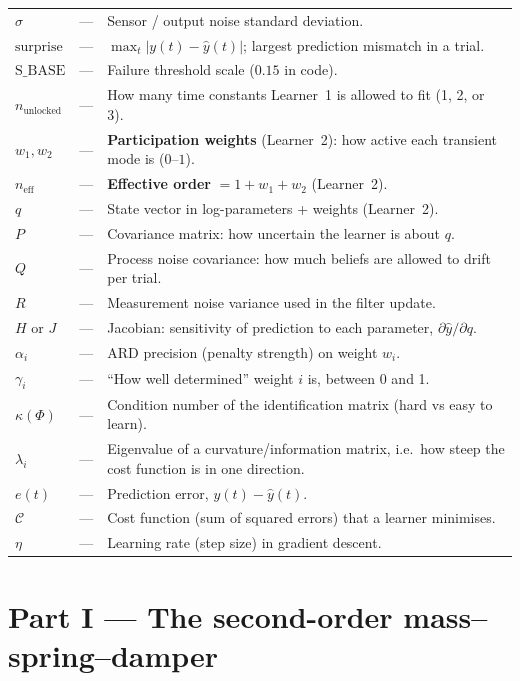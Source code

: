\documentclass[11pt,a4paper]{article}
\newcommand{\surprise}{\text{surprise}}
\newcommand{\neff}{n_{\mathrm{eff}}}
\begin{document}
\begin{longtable}{@{}p{2.4cm}p{1.6cm}p{9.8cm}@{}}
$\sigma$ & --- & Sensor / output noise standard deviation. \\
$\surprise$ & --- & $\max_t|y(t)-\hat y(t)|$; largest prediction mismatch in a trial. \\
$\mathrm{S\_BASE}$ & --- & Failure threshold scale ($0.15$ in code). \\
$n_{\mathrm{unlocked}}$ & --- & How many time constants Learner~1 is allowed to fit (1, 2, or 3). \\
$w_1,w_2$ & --- & \textbf{Participation weights} (Learner~2): how active each transient mode is ($0$--$1$). \\
$\neff$ & --- & \textbf{Effective order} $=1+w_1+w_2$ (Learner~2). \\
$q$ & --- & State vector in log-parameters + weights (Learner~2). \\
$P$ & --- & Covariance matrix: how uncertain the learner is about $q$. \\
$Q$ & --- & Process noise covariance: how much beliefs are allowed to drift per trial. \\
$R$ & --- & Measurement noise variance used in the filter update. \\
$H$ or $J$ & --- & Jacobian: sensitivity of prediction to each parameter, $\partial \hat y/\partial q$. \\
$\alpha_i$ & --- & ARD precision (penalty strength) on weight $w_i$. \\
$\gamma_i$ & --- & ``How well determined'' weight $i$ is, between 0 and 1. \\
$\kappa(\Phi)$ & --- & Condition number of the identification matrix (hard vs easy to learn). \\
$\lambda_i$ & --- & Eigenvalue of a curvature/information matrix, i.e.\ how steep the cost function is in one direction. \\
$e(t)$ & --- & Prediction error, $y(t)-\hat y(t)$. \\
$\mathcal C$ & --- & Cost function (sum of squared errors) that a learner minimises. \\
$\eta$ & --- & Learning rate (step size) in gradient descent. \\
\bottomrule
\end{longtable}
\normalsize

\section{Part I --- The second-order mass--spring--damper}
\label{sec:msd}
\end{document}
